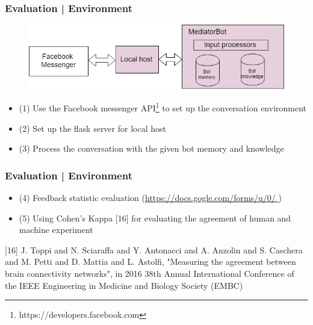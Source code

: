 \documentclass{beamer}
\begin{document}
\begin{frame}
\frametitle{Evaluation | Environment}
\begin{figure}
	\includegraphics[width=.8\textwidth]{ue1.png}
\end{figure}
\begin{itemize}
	\item (1) Use the Facebook messenger API\footnote{https://developers.facebook.com} to set up the conversation environment
	\item  (2) Set up the flask server for local host 
	\item  (3) Process the conversation with the given bot memory and knowledge 
\end{itemize}

\end{frame}
\begin{frame}
\frametitle{Evaluation | Environment}
\begin{itemize}
	\item  (4) Feedback statistic evaluation (\url{https://docs.gogle.com/forms/u/0/ })
\item  (5) Using Cohen's Kappa [16] for evaluating the agreement of human and machine experiment 
\end{itemize}
\begin{thebibliography}{01}
{\tiny 	{} [16] {J. {Toppi} and N. {Sciaraffa} and Y. {Antonacci} and A. {Anzolin} and S. {Caschera} and M. {Petti} and D. {Mattia} and L. {Astolfi}}, "Measuring the agreement between brain connectivity networks", in 2016 38th Annual International Conference of the IEEE Engineering in Medicine and Biology Society (EMBC)}
\end{thebibliography}


\end{frame}
\end{document}
